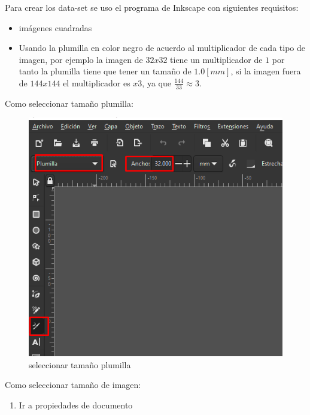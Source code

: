 \documentclass[
  spanish,
]{article}
\providecommand{\tightlist}{%
  \setlength{\itemsep}{0pt}\setlength{\parskip}{0pt}}
\begin{document}
Para crear los data-set se uso el programa de Inkscape con siguientes
requisitos:

\begin{itemize}
\tightlist
\item
  imágenes cuadradas
\item
  Usando la plumilla en color negro de acuerdo al multiplicador de cada
  tipo de imagen, por ejemplo la imagen de \(32x32\) tiene un
  multiplicador de \(1\) por tanto la plumilla tiene que tener un tamaño
  de \(1.0[mm]\), si la imagen fuera de \(144x144\) el multiplicador es
  \(x3\), ya que \(\frac{144}{33} \approx 3\).
\end{itemize}

Como seleccionar tamaño plumilla:

\begin{figure}
\centering
\includegraphics{img/README/image-20220516010023659.png}
\caption{seleccionar tamaño plumilla}
\end{figure}

Como seleccionar tamaño de imagen:

\begin{enumerate}
\def\labelenumi{\arabic{enumi}.}
\tightlist
\item
  Ir a propiedades de documento
\end{enumerate}
\end{document}
